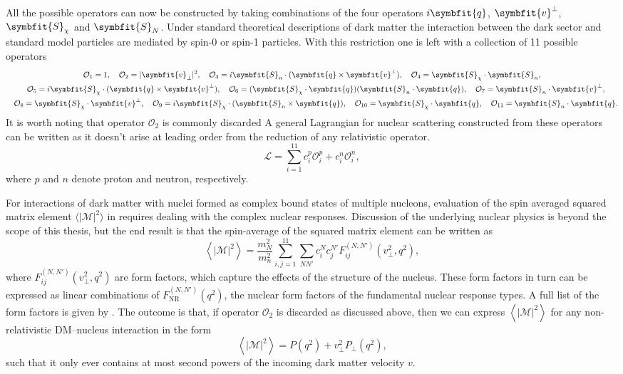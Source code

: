 \documentclass[b5paper, 10pt, twoside]{book}
\renewcommand{\vec}[1]{\symbfit{#1}}
\newcommand{\mean}[1]{\left\langle#1\right\rangle}
\newcommand{\tmean}[1]{\langle#1\rangle}
\begin{document}
All the possible operators can now be constructed by taking combinations of the four operators $i\vec{q}$, $\vec{v}^\perp$, $\vec{S}_\chi$ and $\vec{S}_N$. Under standard theoretical descriptions of dark matter the interaction between the dark sector and standard model particles are mediated by spin-0 or spin-1 particles. With this restriction one is left with a collection of 11 possible operators
\begin{gather*}
\mathcal{O}_1=1,\quad\mathcal{O}_2=|\vec{v}_\perp|^2,\quad\mathcal{O}_3=i\vec{S}_n\cdot(\vec{q}\times\vec{v}^\perp),\quad\mathcal{O}_4=\vec{S}_\chi\cdot\vec{S}_n,\\
\quad\mathcal{O}_5=i\vec{S}_\chi\cdot(\vec{q}\times\vec{v}^\perp),\quad\mathcal{O}_6=(\vec{S}_\chi\cdot\vec{q})(\vec{S}_n\cdot\vec{q}),\quad\mathcal{O}_7=\vec{S}_n\cdot\vec{v}^\perp,\\
\quad\mathcal{O}_8=\vec{S}_\chi\cdot\vec{v}^\perp,\quad\mathcal{O}_9=i\vec{S}_\chi\cdot(\vec{S}_n\times\vec{q}),\quad\mathcal{O}_{10}=\vec{S}_\chi\cdot\vec{q},\quad\mathcal{O}_{11}=\vec{S}_n\cdot\vec{q}.
\end{gather*}
It is worth noting that operator $\mathcal{O}_2$ is commonly discarded A general Lagrangian for nuclear scattering constructed from these operators can be written as it doesn't arise at leading order from the reduction of any relativistic operator.
\begin{equation}
\mathcal{L}=\sum_{i=1}^{11}c_i^p\mathcal{O}_i^p+c_i^n\mathcal{O}_i^n,
\end{equation}
where $p$ and $n$ denote proton and neutron, respectively.

For interactions of dark matter with nuclei formed as complex bound states of multiple nucleons, evaluation of the spin averaged squared matrix element $\tmean{|\mathcal{M}|^2}$ in requires dealing with the complex nuclear responses. Discussion of the underlying nuclear physics is beyond the scope of this thesis, but the end result is that the spin-average of the squared matrix element can be written as
\begin{equation}
\mean{|\mathcal{M}|^2}=\frac{m_N^2}{m_n^2}\sum_{i,j=1}^{11}\sum_{NN'}c_i^Nc_j^{N'}F_{ij}^{(N,N')}(v_\perp^2,q^2),
\end{equation}
where $F_{ij}^{(N,N')}(v_\perp^2,q^2)$ are form factors, which capture the effects of the structure of the nucleus. These form factors in turn can be expressed as linear combinations of $F_\text{NR}^{(N,N')}(q^2)$, the nuclear form factors of the fundamental nuclear response types. A full list of the form factors is given by \textcite{FitzpatrickEtAl2013}. The outcome is that, if operator $\mathcal{O}_2$ is discarded as discussed above, then we can express $\mean{|\mathcal{M}|^2}$ for any non-relativistic DM--nucleus interaction in the form
\begin{equation}
\mean{|\mathcal{M}|^2}=P(q^2)+v_\perp^2P_\perp(q^2),
\label{eq:eft-amplitude-square}
\end{equation}
such that it only ever contains at most second powers of the incoming dark matter velocity $v$.
\end{document}
